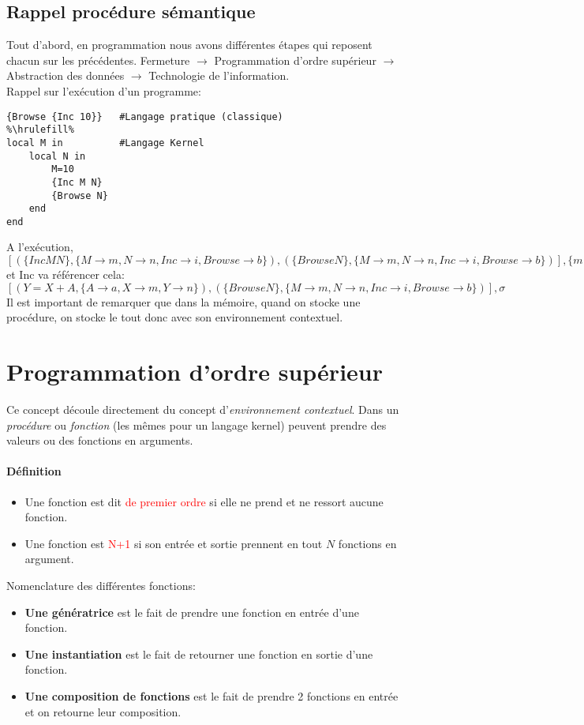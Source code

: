 \documentclass{report}
\begin{document}
\section{Rappel procédure sémantique}
Tout d'abord, en programmation nous avons différentes étapes qui reposent chacun sur les précédentes. Fermeture $\rightarrow$ Programmation d'ordre supérieur $\rightarrow$ Abstraction des données $\rightarrow$ Technologie de l'information.\\

Rappel sur l'exécution d'un programme:
\begin{lstlisting}[escapechar=\%]
{Browse {Inc 10}}	#Langage pratique (classique)
%\hrulefill%
local M in		 	#Langage Kernel
	local N in
		M=10
		{Inc M N}
		{Browse N}
	end
end
\end{lstlisting}
A l'exécution,$[(\{Inc M N\},\{M\rightarrow m,N \rightarrow n,Inc \rightarrow i,Browse \rightarrow b\}), (\{Browse N\},\{M \rightarrow m,N \rightarrow n,Inc \rightarrow i,Browse \rightarrow b\})],
\{m=10,n,i=(proc \{\$ X Y\} Y=X+A end, \{A \rightarrow a\}), a=1,b=(... browser code…)\}$ et Inc va référencer cela:\\
$[(Y=X+A,\{A\rightarrow a,X \rightarrow m,Y \rightarrow n\}), (\{Browse N\},\{M \rightarrow m,N \rightarrow n,Inc \rightarrow i,Browse \rightarrow b\})],
\sigma$\\
Il est important de remarquer que dans la mémoire, quand on stocke une procédure, on stocke le tout donc avec son environnement contextuel.


\chapter{Programmation d'ordre supérieur}
Ce concept découle directement du concept d'\textit{environnement contextuel}. Dans un \textit{procédure} ou \textit{fonction} (les mêmes pour un langage kernel) peuvent prendre des valeurs ou des fonctions en arguments.
\subsubsection{Définition}
\begin{itemize}
\item Une fonction est dit \textcolor{red}{de premier ordre} si elle ne prend et ne ressort aucune fonction.
\item Une fonction est \textcolor{red}{N+1} si son entrée et sortie prennent en tout $N$ fonctions en argument.
\end{itemize}
Nomenclature des différentes fonctions:
\begin{itemize}
\item \textbf{Une génératrice} est le fait de prendre une fonction en entrée d'une fonction.
\item \textbf{Une instantiation} est le fait de retourner une fonction en sortie d'une fonction.
\item \textbf{Une composition de fonctions} est le fait de prendre 2 fonctions en entrée et on retourne leur composition.
\end{itemize}
\end{document}
